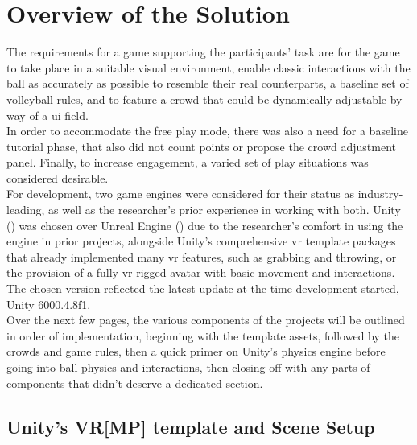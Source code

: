 \section{Overview of the Solution}

The requirements for a game supporting the participants' task are for the game to take place in a suitable visual environment, enable classic interactions with the ball as accurately as possible to resemble their real counterparts, a baseline set of volleyball rules, and to feature a crowd that could be dynamically adjustable by way of a \gls{ui} field.\\
In order to accommodate the free play mode, there was also a need for a baseline tutorial phase, that also did not count points or propose the crowd adjustment panel. Finally, to increase engagement, a varied set of play situations was considered desirable.\\

For development, two game engines were considered for their status as industry-leading, as well as the researcher's prior experience in working with both. Unity (\cite{unity-engine}) was chosen over Unreal Engine (\cite{unreal-engine}) due to the researcher's comfort in using the engine in prior projects, alongside Unity's comprehensive \gls{vr} template packages that already implemented many \gls{vr} features, such as grabbing and throwing, or the provision of a fully \gls{vr}-rigged avatar with basic movement and interactions. The chosen version reflected the latest update at the time development started, Unity 6000.4.8f1.\\

Over the next few pages, the various components of the projects will be outlined in order of implementation, beginning with the template assets, followed by the crowds and game rules, then a quick primer on Unity's physics engine before going into ball physics and interactions, then closing off with any parts of components that didn't deserve a dedicated section.

\subsection{Unity's VR[MP] template and Scene Setup}

